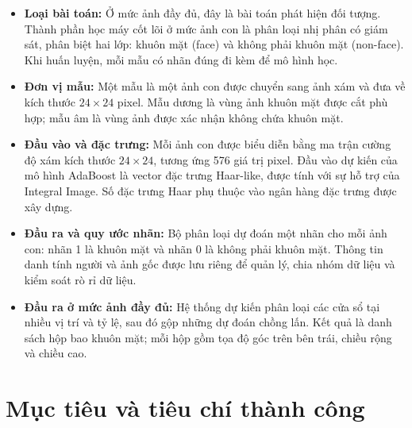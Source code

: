 \documentclass[12pt,a4paper,oneside]{report}
\begin{document}
\begin{itemize}
    \item \textbf{Loại bài toán:}
    Ở mức ảnh đầy đủ, đây là bài toán phát hiện đối tượng.
    Thành phần học máy cốt lõi ở mức ảnh con là phân loại
    nhị phân có giám sát, phân biệt hai lớp: khuôn mặt
    (face) và không phải khuôn mặt (non-face).
    Khi huấn luyện, mỗi mẫu có nhãn đúng đi kèm để mô hình học.

    \item \textbf{Đơn vị mẫu:}
    Một mẫu là một ảnh con được chuyển sang ảnh xám và đưa
    về kích thước $24 \times 24$ pixel. Mẫu dương là vùng
    ảnh khuôn mặt được cắt phù hợp; mẫu âm là vùng ảnh
    được xác nhận không chứa khuôn mặt.

    \item \textbf{Đầu vào và đặc trưng:}
    Mỗi ảnh con được biểu diễn bằng ma trận cường độ xám
    kích thước $24 \times 24$, tương ứng 576 giá trị pixel.
    Đầu vào dự kiến của mô hình AdaBoost là vector đặc trưng
    Haar-like, được tính với sự hỗ trợ của Integral Image.
    Số đặc trưng Haar phụ thuộc vào ngân hàng đặc trưng
    được xây dựng.

    \item \textbf{Đầu ra và quy ước nhãn:}
    Bộ phân loại dự đoán một nhãn cho mỗi ảnh con:
    nhãn 1 là khuôn mặt và nhãn 0 là không phải khuôn mặt.
    Thông tin danh tính người và ảnh gốc được lưu riêng
    để quản lý, chia nhóm dữ liệu và kiểm soát rò rỉ dữ liệu.

    \item \textbf{Đầu ra ở mức ảnh đầy đủ:}
    Hệ thống dự kiến phân loại các cửa sổ tại nhiều vị trí
    và tỷ lệ, sau đó gộp những dự đoán chồng lấn.
    Kết quả là danh sách hộp bao khuôn mặt; mỗi hộp gồm
    tọa độ góc trên bên trái, chiều rộng và chiều cao.
\end{itemize}
\section{Mục tiêu và tiêu chí thành công}
\end{document}
